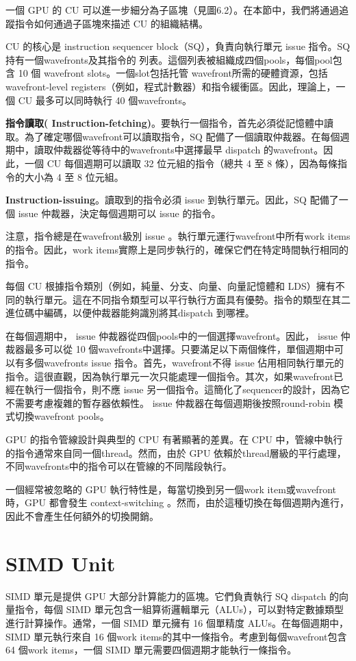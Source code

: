 一個 GPU 的 CU 可以進一步細分為子區塊（見圖6.2）。在本節中，我們將通過追蹤指令如何通過子區塊來描述 CU 的組織結構。

CU 的核心是 instruction sequencer block（SQ），負責向執行單元 issue 指令。SQ 持有一個wavefronts及其指令的 列表。這個列表被組織成四個pools，每個pool包含 10 個 wavefront slots。一個slot包括托管 wavefront所需的硬體資源，包括wavefront-level registers（例如，程式計數器）和指令緩衝區。因此，理論上，一個 CU 最多可以同時執行 40 個wavefronts。

\textbf{指令讀取( Instruction-fetching)}。要執行一個指令，首先必須從記憶體中讀取。為了確定哪個wavefront可以讀取指令，SQ 配備了一個讀取仲裁器。在每個週期中，讀取仲裁器從等待中的wavefronts中選擇最早 dispatch 的wavefront。因此，一個 CU 每個週期可以讀取 32 位元組的指令（總共 4 至 8 條），因為每條指令的大小為 4 至 8 位元組。


\textbf{Instruction-issuing}。讀取到的指令必須 issue 到執行單元。因此，SQ 配備了一個 issue 仲裁器，決定每個週期可以 issue 的指令。

注意，指令總是在wavefront級別 issue 。執行單元運行wavefront中所有work items的指令。因此，work items實際上是同步執行的，確保它們在特定時間執行相同的指令。

每個 CU 根據指令類別（例如，純量、分支、向量、向量記憶體和 LDS）擁有不同的執行單元。這在不同指令類型可以平行執行方面具有優勢。指令的類型在其二進位碼中編碼，以便仲裁器能夠識別將其dispatch 到哪裡。

在每個週期中， issue 仲裁器從四個pools中的一個選擇wavefront。因此， issue 仲裁器最多可以從 10 個wavefronts中選擇。只要滿足以下兩個條件，單個週期中可以有多個wavefronts issue 指令。首先，wavefront不得 issue 佔用相同執行單元的指令。這很直觀，因為執行單元一次只能處理一個指令。其次，如果wavefront已經在執行一個指令，則不應 issue 另一個指令。這簡化了sequencer的設計，因為它不需要考慮複雜的暫存器依賴性。 issue 仲裁器在每個週期後按照round-robin 模式切換wavefront pools。

GPU 的指令管線設計與典型的 CPU 有著顯著的差異。在 CPU 中，管線中執行的指令通常來自同一個thread。然而，由於 GPU 依賴於thread層級的平行處理，不同wavefronts中的指令可以在管線的不同階段執行。

一個經常被忽略的 GPU 執行特性是，每當切換到另一個work item或wavefront時，GPU 都會發生 context-switching 。然而，由於這種切換在每個週期內進行，因此不會產生任何額外的切換開銷。

\section{SIMD Unit}
SIMD 單元是提供 GPU 大部分計算能力的區塊。它們負責執行 SQ  dispatch 的向量指令，每個 SIMD 單元包含一組算術邏輯單元（ALUs），可以對特定數據類型進行計算操作。通常，一個 SIMD 單元擁有 16 個單精度 ALUs。在每個週期中，SIMD 單元執行來自 16 個work items的其中一條指令。考慮到每個wavefront包含 64 個work items，一個 SIMD 單元需要四個週期才能執行一條指令。

